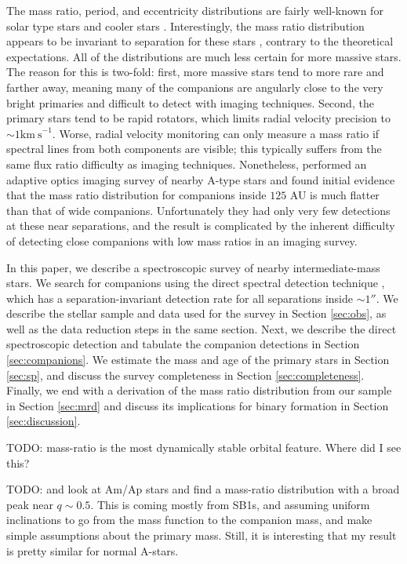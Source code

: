 \documentclass{emulateapj}
\begin{document}
The mass ratio, period, and eccentricity distributions are fairly well-known for solar type stars \citep{Duquennoy1991, Raghavan2010} and cooler stars \citep{Fischer1992, Delfosse2004}. Interestingly, the mass ratio distribution appears to be invariant to separation for these stars \citep{Meyer2013}, contrary to the theoretical expectations. All of the distributions are much less certain for more massive stars. The reason for this is two-fold: first, more massive stars tend to more rare and farther away, meaning many of the companions are angularly close to the very bright primaries and difficult to detect with imaging techniques. Second, the primary stars tend to be rapid rotators, which limits radial velocity precision to $\sim 1 \mathrm{km\ s}^{-1}$. Worse, radial velocity monitoring can only measure a mass ratio if spectral lines from both components are visible; this typically suffers from the same flux ratio difficulty as imaging techniques. Nonetheless, \citet{DeRosa2014} performed an adaptive optics imaging survey of nearby A-type stars and found initial evidence that the mass ratio distribution for companions inside $125$ AU is much flatter than that of wide companions. Unfortunately they had only very few detections at these near separations, and the result is complicated by the inherent difficulty of detecting close companions with low mass ratios in an imaging survey.

In this paper, we describe a spectroscopic survey of nearby intermediate-mass stars. We search for companions using the direct spectral detection technique \citep{Gullikson2016}, which has a separation-invariant detection rate for all separations inside $\sim 1 ''$. We describe the stellar sample and data used for the survey in Section \ref{sec:obs}, as well as the data reduction steps in the same section. Next, we describe the direct spectroscopic detection and tabulate the companion detections in Section \ref{sec:companions}. We estimate the mass and age of the primary stars in Section \ref{sec:sp}, and discuss the survey completeness in Section \ref{sec:completeness}. Finally, we end with a derivation of the mass ratio distribution from our sample in Section \ref{sec:mrd} and discuss its implications for binary formation in Section \ref{sec:discussion}.



TODO: mass-ratio is the most dynamically stable orbital feature. Where did I see this?

TODO: \citep{Carrier2002} and \citep{Vuissoz2004} look at Am/Ap stars and find a mass-ratio distribution with a broad peak near $q \sim 0.5$. This is coming mostly from SB1s, and assuming uniform inclinations to go from the mass function to the companion mass, and make simple assumptions about the primary mass. Still, it is interesting that my result is pretty similar for normal A-stars.
\end{document}
